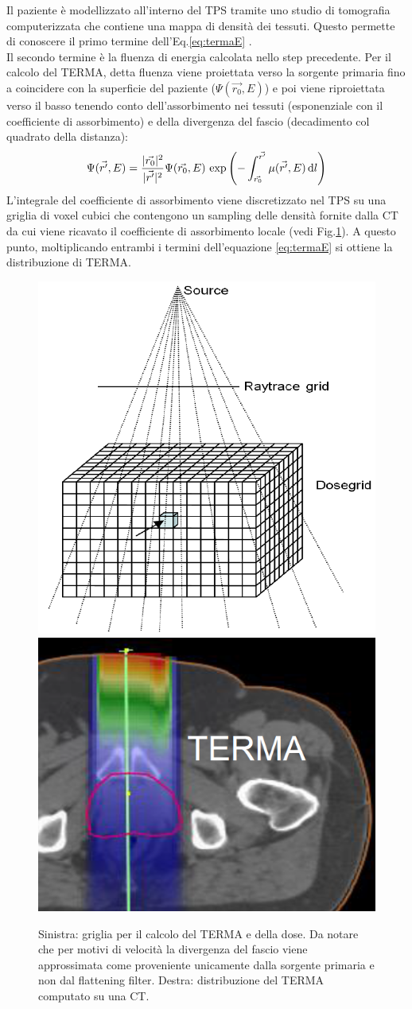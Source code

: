 {Il paziente è modellizzato all'interno del TPS tramite uno studio di tomografia computerizzata che contiene una mappa di densità dei tessuti. Questo permette di conoscere il primo termine dell'Eq.\eqref{eq:termaE} \cite{RaySearchLaboratories2014}.\\
Il secondo termine è la fluenza di energia calcolata nello step precedente. Per il calcolo del TERMA, detta fluenza viene proiettata verso la sorgente primaria fino a coincidere con la superficie del paziente ($\Psi(\vec{r_0},E)$) e poi viene riproiettata verso il basso tenendo conto dell'assorbimento nei tessuti (esponenziale con il coefficiente di assorbimento) e della divergenza del fascio (decadimento col quadrato della distanza):
\begin{equation}
\label{eq:fluence}
\Psi(\vec{r'},E) = \frac{|\vec{r_0}|^2}{|\vec{r'}|^2}\Psi(\vec{r_0},E)\,\exp{\left( -\int_{\vec{r_0}}^{\vec{r'}} \mu(\vec{r'},E) \,\text{d}l \right)}
\end{equation}
L'integrale del coefficiente di assorbimento viene discretizzato nel TPS su una griglia di voxel cubici che contengono un sampling delle densità fornite dalla CT da cui viene ricavato il coefficiente di assorbimento locale (vedi Fig.\ref{fig:terma}). A questo punto, moltiplicando entrambi i termini dell'equazione \eqref{eq:termaE} si ottiene la distribuzione di TERMA.

\begin{figure}
\centering
\includegraphics[width=.4\textwidth]{./cap1/terma_1.png}
\includegraphics[width=.5\textwidth]{./cap1/terma_2.png}
\caption{Sinistra: griglia per il calcolo del TERMA e della dose. Da notare che per motivi di velocità la divergenza del fascio viene approssimata come proveniente unicamente dalla sorgente primaria e non dal flattening filter. Destra: distribuzione del TERMA computato su una CT.}
\label{fig:terma}
\end{figure}

}
